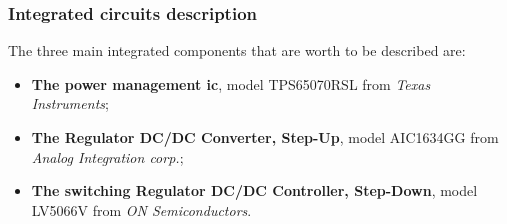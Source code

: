 \documentclass[11pt,a4paper,titlepage]{article}
\begin{document}
		  \subsubsection{Integrated circuits description}
				The three main integrated components that are worth to be described are:
				\begin{itemize}
				  \item \textbf{The power management \gls{ic}}, model TPS65070RSL from \textit{Texas Instruments};
				  \item \textbf{The Regulator DC/DC Converter, Step-Up}, model AIC1634GG from \textit{Analog Integration corp.};
				  \item \textbf{The switching Regulator DC/DC Controller, Step-Down}, model LV5066V from \textit{ON Semiconductors}.
				\end{itemize}
\end{document}
